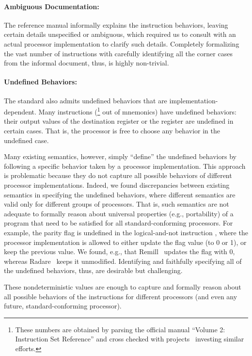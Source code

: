 \paragraph{Ambiguous Documentation:}
%
The \ISA reference manual informally explains the instruction behaviors, leaving certain details unspecified or ambiguous, which required us to consult with an actual processor implementation to clarify such details.
%
Completely formalizing the vast number of instructions with carefully identifying all the corner cases from the informal document, thus, is highly non-trivial.


\paragraph{Undefined Behaviors:}
%
The \ISA standard also admits undefined behaviors that are implementation-dependent.
Many instructions (\undefIntel{}\footnote{\label{note1}These numbers are obtained by parsing the official manual ``Volume 2: Instruction Set Reference'' and cross checked with projects~\cite{Stoke2013, Felix} investing similar efforts.} out of \totalIntel{} mnemonics) have undefined behaviors: their output values of the destination register or the  register are undefined in certain cases.
That is, the processor is free to choose any behavior in the undefined case.


Many existing semantics, however, simply ``define'' the undefined behaviors by
following a specific behavior taken by a processor implementation.
This approach is problematic because they do not capture all possible behaviors of different processor implementations.
Indeed, we found discrepancies between existing semantics in specifying the undefined behaviors, where different semantics are valid only for different groups of processors.
That is, such semantics are not adequate to formally reason about universal properties (e.g., portability) of a program that need to be satisfied for all standard-conforming processors.
%
For example, the parity flag  is undefined in the logical-and-not instruction , where the processor implementation is allowed to either update the flag value (to 0 or 1), or keep the previous value.
We found, e.g., that Remill~\cite{Remill} updates the flag with 0, whereas Radare~\cite{Radare2} keeps it unmodified.
Identifying and faithfully specifying all of the undefined behaviors, thus, are desirable but challenging.

These nondeterministic values are enough to capture and formally reason about all possible behaviors of the instructions for different processors (and even any future, standard-conforming processor).

